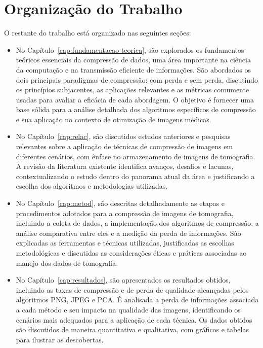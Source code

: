 \section{Organização do Trabalho}
\label{intro:organ}
O restante do trabalho está organizado nas seguintes seções:
\begin{itemize}
    \item No Capítulo~\ref{cap:fundamentacao-teorica}, são explorados os fundamentos teóricos essenciais da compressão de dados, uma área importante na ciência da computação e na transmissão eficiente de informações. São abordados os dois principais paradigmas de compressão: com perda e sem perda, discutindo os princípios subjacentes, as aplicações relevantes e as métricas comumente usadas para avaliar a eficácia de cada abordagem. O objetivo é fornecer uma base sólida para a análise detalhada dos algoritmos específicos de compressão e sua aplicação no contexto de otimização de imagens médicas.

    \item No Capítulo~\ref{cap:relac}, são discutidos estudos anteriores e pesquisas relevantes sobre a aplicação de técnicas de compressão de imagens em diferentes cenários, com ênfase no armazenamento de imagens de tomografia. A revisão da literatura existente identifica avanços, desafios e lacunas, contextualizando o estudo dentro do panorama atual da área e justificando a escolha dos algoritmos e metodologias utilizadas.

    \item No Capítulo~\ref{cap:metod}, são descritas detalhadamente as etapas e procedimentos adotados para a compressão de imagens de tomografia, incluindo a coleta de dados, a implementação dos algoritmos de compressão, a análise comparativa entre eles e a medição da perda de informações. São explicadas as ferramentas e técnicas utilizadas, justificadas as escolhas metodológicas e discutidas as considerações éticas e práticas associadas ao manejo dos dados de tomografia.

    \item No Capítulo~\ref{cap:resultados}, são apresentados os resultados obtidos, incluindo as taxas de compressão e de perda de qualidade alcançadas pelos algoritmos \acrshort{PNG}, \acrshort{JPEG} e \acrshort{PCA}. É analisada a perda de informações associada a cada método e seu impacto na qualidade das imagens, identificando os cenários mais adequados para a aplicação de cada técnica. Os dados obtidos são discutidos de maneira quantitativa e qualitativa, com gráficos e tabelas para ilustrar as descobertas.


\end{itemize}
